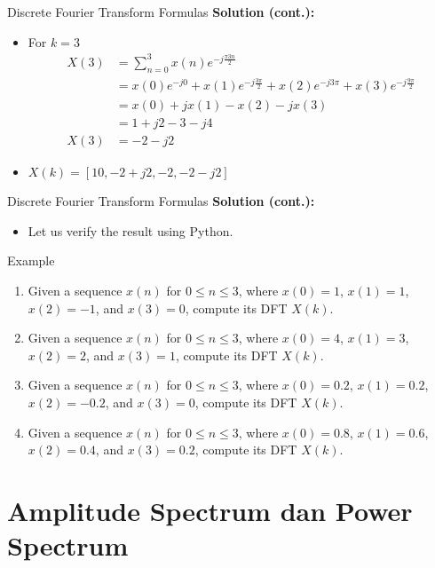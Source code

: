 \documentclass[pdflatex,compress,mathserif]{beamer}
\begin{document}
\begin{frame}[fragile]{Discrete Fourier Transform Formulas}
    \textbf{Solution (cont.):}
    \begin{itemize}
        \item For $k = 3$
        \begin{align*}
            X(3) &= \sum_{n=0}^{3} x(n)e^{-j\frac{\pi 3n}{2}} \\
            &= x(0)e^{-j0} + x(1)e^{-j \frac{3\pi}{2}} + x(2)e^{-j 3\pi} + x(3)e^{-j\frac{9\pi}{2}} \\
            &= x(0) + jx(1) - x(2) - jx(3) \\
            &= 1 + j2 - 3 - j4 \\
            X(3) &= -2 - j2
        \end{align*}
        \item $X(k) = [10, -2+j2, -2, -2 - j2]$
    \end{itemize}
\end{frame}

\begin{frame}[fragile]{Discrete Fourier Transform Formulas}
    \textbf{Solution (cont.):}
    \begin{itemize}
        \item Let us verify the result using Python.
    \end{itemize}
\end{frame}

\begin{frame}{Example}

    \begin{enumerate}
        \item Given a sequence $x(n)$ for $0 \leq n \leq 3$, where $x(0)=1$, $x(1)=1$, $x(2)=-1$, and $x(3)=0$, compute its DFT $X(k)$.
        \item Given a sequence $x(n)$ for $0 \leq n \leq 3$, where $x(0)=4$, $x(1)=3$, $x(2)=2$, and $x(3)=1$, compute its DFT $X(k)$.
        \item Given a sequence $x(n)$ for $0 \leq n \leq 3$, where $x(0)=0.2$, $x(1)=0.2$, $x(2)=-0.2$, and $x(3)=0$, compute its DFT $X(k)$.
        \item Given a sequence $x(n)$ for $0 \leq n \leq 3$, where $x(0)=0.8$, $x(1)=0.6$, $x(2)=0.4$, and $x(3)=0.2$, compute its DFT $X(k)$.
    \end{enumerate}
\end{frame}

\section{Amplitude Spectrum dan Power Spectrum}
\end{document}

